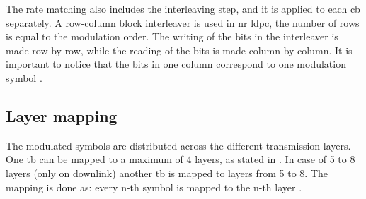 The rate matching also includes the interleaving step, and it is applied to each \gls{cb} separately.
%
A row-column block interleaver is used in \gls{nr} \gls{ldpc}, the number of rows is equal to the modulation order.
%
The writing of the bits in the interleaver is made row-by-row, while the reading of the bits is made column-by-column.
%
It is important to notice that the bits in one column correspond to one modulation symbol \cite{Hamidi8417496,ErikDahlman5G}.

\subsection{Layer mapping}

The modulated symbols are distributed across the different transmission layers.
%
One \gls{tb} can be mapped to a maximum of 4 layers, as stated in  \cite[Table 7.3.1.3]{3gpp.38.211}.
%
In case of 5 to 8 layers (only on downlink) another \gls{tb} is mapped to layers from 5 to 8.
%
The mapping is done as: every n-th symbol is mapped to the n-th layer \cite{ErikDahlman5G}.

